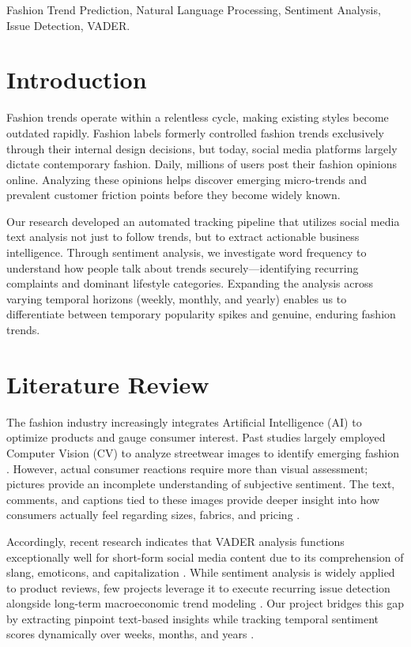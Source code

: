 \documentclass[conference]{IEEEtran}
\begin{document}
\begin{IEEEkeywords}
Fashion Trend Prediction, Natural Language Processing, Sentiment Analysis, Issue Detection, VADER.
\end{IEEEkeywords}

\section{Introduction}
Fashion trends operate within a relentless cycle, making existing styles become outdated rapidly. Fashion labels formerly controlled fashion trends exclusively through their internal design decisions, but today, social media platforms largely dictate contemporary fashion. Daily, millions of users post their fashion opinions online. Analyzing these opinions helps discover emerging micro-trends and prevalent customer friction points before they become widely known.

Our research developed an automated tracking pipeline that utilizes social media text analysis not just to follow trends, but to extract actionable business intelligence. Through sentiment analysis, we investigate word frequency to understand how people talk about trends securely—identifying recurring complaints and dominant lifestyle categories. Expanding the analysis across varying temporal horizons (weekly, monthly, and yearly) enables us to differentiate between temporary popularity spikes and genuine, enduring fashion trends.

\section{Literature Review}
The fashion industry increasingly integrates Artificial Intelligence (AI) to optimize products and gauge consumer interest. Past studies largely employed Computer Vision (CV) to analyze streetwear images to identify emerging fashion \cite{4}. However, actual consumer reactions require more than visual assessment; pictures provide an incomplete understanding of subjective sentiment. The text, comments, and captions tied to these images provide deeper insight into how consumers actually feel regarding sizes, fabrics, and pricing \cite{3}.

Accordingly, recent research indicates that VADER analysis functions exceptionally well for short-form social media content due to its comprehension of slang, emoticons, and capitalization \cite{6}. While sentiment analysis is widely applied to product reviews, few projects leverage it to execute recurring issue detection alongside long-term macroeconomic trend modeling \cite{2}. Our project bridges this gap by extracting pinpoint text-based insights while tracking temporal sentiment scores dynamically over weeks, months, and years \cite{7}.
\end{document}
